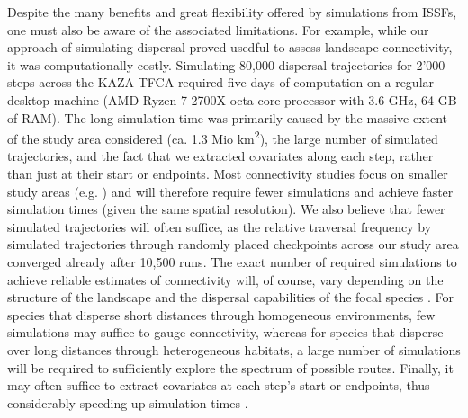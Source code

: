 \documentclass[abstract=on,10pt,a4paper,bibliography=totocnumbered]{article}
\begin{document}

Despite the many benefits and great flexibility offered by simulations from
ISSFs, one must also be aware of the associated limitations. For example, while
our approach of simulating dispersal proved usedful to assess landscape
connectivity, it was computationally costly. Simulating 80,000 dispersal
trajectories for 2'000 steps across the KAZA-TFCA required five days of
computation on a regular desktop machine (AMD Ryzen 7 2700X octa-core processor
with 3.6 GHz, 64 GB of RAM). The long simulation time was primarily caused by
the massive extent of the study area considered (ca. 1.3 Mio
km\textsuperscript{2}), the large number of simulated trajectories, and the fact
that we extracted covariates along each step, rather than just at their start or
endpoints. Most connectivity studies focus on smaller study areas (e.g.
\citealp{Kanagaraj.2013, Clark.2015, McClure.2016, Abrahms.2017, Zeller.2020})
and will therefore require fewer simulations and achieve faster simulation times
(given the same spatial resolution). We also believe that fewer simulated
trajectories will often suffice, as the relative traversal frequency by
simulated trajectories through randomly placed checkpoints across our study area
converged already after 10,500 runs. The exact number of required simulations to
achieve reliable estimates of connectivity will, of course, vary depending on
the structure of the landscape and the dispersal capabilities of the focal
species \citep{Gustafson.1996}. For species that disperse short distances
through homogeneous environments, few simulations may suffice to gauge
connectivity, whereas for species that disperse over long distances through
heterogeneous habitats, a large number of simulations will be required to
sufficiently explore the spectrum of possible routes. Finally, it may often
suffice to extract covariates at each step's start or endpoints, thus
considerably speeding up simulation times \citep{Signer.2017}.
\end{document}
